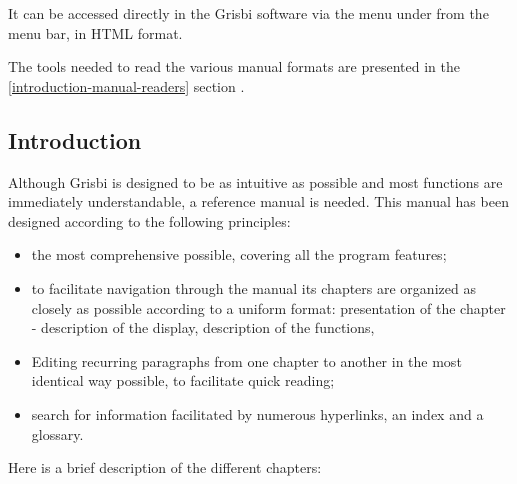 It can be accessed directly in the Grisbi software via the menu under  from the menu bar, in HTML format.


The tools needed to read the various manual formats are presented in the  \vref{introduction-manual-readers} section .

\subsection{Introduction \label{introduction-manual-presentation}}

Although Grisbi is designed to be as intuitive as possible and most functions are immediately understandable, a reference manual is needed. This manual has been designed according to the following principles:

\begin{itemize}%
	\item the most comprehensive possible, covering all the program features;
	\item to facilitate navigation through the manual its chapters are organized as closely as possible according to a uniform format: presentation of the chapter - description of the display, description of the functions, 
	\item Editing recurring paragraphs from one chapter to another in the most identical way possible, to facilitate quick reading;
	\item search for information facilitated by numerous \gls{hyperlinks}, an index and a glossary.
\end{itemize}



Here is a brief description of the different chapters:

